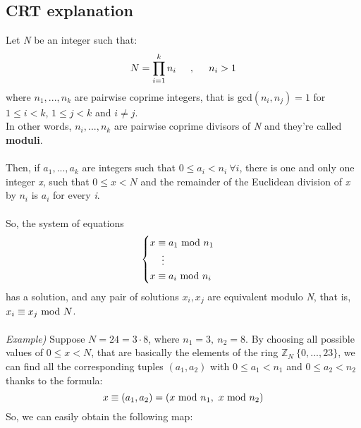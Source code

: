 \subsection{CRT explanation}
Let \textit{N} be an integer such that:
$$N=\prod_{i=1}^kn_i\hspace{0.5cm},\hspace{0.5cm} n_i>1$$
where $n_1,...,n_k$ are pairwise coprime integers, that is $\text{gcd}(n_i,n_j)=1$ for $1\le i<k$, $1\le j<k$ and $i\ne j$.\\In other words, $n_i,...,n_k$ are pairwise coprime divisors of \textit{N} and they're called \textbf{moduli}.\\\\
Then, if $a_1,...,a_k$ are integers such that $0\le a_i<n_i \ \forall i$, there is one and only one integer \textit{x}, such that $0\le x<N$ and the remainder of the Euclidean division of \textit{x} by $n_i$ is $a_i$ for every \textit{i}.\\\\
So, the system of equations
\begin{equation*}
    \begin{cases}
        x\equiv a_1\text{ mod } n_1\\
        \hspace{0.42cm}\vdots\\
        x\equiv a_i\text{ mod } n_i
    \end{cases}
\end{equation*}
has a solution, and any pair of solutions $x_i,x_j$ are equivalent modulo \textit{N}, that is, $x_i\equiv x_j\text{ mod } N$.\\\\
\textit{Example)} Suppose $N=24=3\cdot8$, where $n_1=3,\ n_2=8$. By choosing all possible values of $0\le x<N$, that are basically the elements of the ring $\mathbb{Z}_N \ \{0,...,23\}$, we can find all the corresponding tuples $(a_1,a_2)$ with $0\le a_1<n_1$ and $0\le a_2<n_2$ thanks to the formula:
$$x\equiv (a_1, a_2)=(x\text{ mod } n_1,\ x\text{ mod } n_2)$$
So, we can easily obtain the following map:
